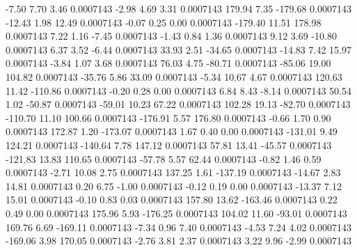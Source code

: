        -7.50        7.70        3.46     0.0007143
       -2.98        4.69        3.31     0.0007143
      179.94        7.35     -179.68     0.0007143
      -12.43        1.98       12.49     0.0007143
       -0.07        0.25        0.00     0.0007143
     -179.40       11.51      178.98     0.0007143
        7.22        1.16       -7.45     0.0007143
       -1.43        0.84        1.36     0.0007143
        9.12        3.69      -10.80     0.0007143
        6.37        3.52       -6.44     0.0007143
       33.93        2.51      -34.65     0.0007143
      -14.83        7.42       15.97     0.0007143
       -3.84        1.07        3.68     0.0007143
       76.03        4.75      -80.71     0.0007143
      -85.06       19.00      104.82     0.0007143
      -35.76        5.86       33.09     0.0007143
       -5.34       10.67        4.67     0.0007143
      120.63       11.42     -110.86     0.0007143
       -0.20        0.28        0.00     0.0007143
        6.84        8.43       -8.14     0.0007143
       50.54        1.02      -50.87     0.0007143
      -59.01       10.23       67.22     0.0007143
      102.28       19.13      -82.70     0.0007143
     -110.70       11.10      100.66     0.0007143
     -176.91        5.57      176.80     0.0007143
       -0.66        1.70        0.90     0.0007143
      172.87        1.20     -173.07     0.0007143
        1.67        0.40        0.00     0.0007143
     -131.01        9.49      124.21     0.0007143
     -140.64        7.78      147.12     0.0007143
       57.81       13.41      -45.57     0.0007143
     -121.83       13.83      110.65     0.0007143
      -57.78        5.57       62.44     0.0007143
       -0.82        1.46        0.59     0.0007143
       -2.71       10.08        2.75     0.0007143
      137.25        1.61     -137.19     0.0007143
      -14.67        2.83       14.81     0.0007143
        0.20        6.75       -1.00     0.0007143
       -0.12        0.19        0.00     0.0007143
      -13.37        7.12       15.01     0.0007143
       -0.10        0.83        0.03     0.0007143
      157.80       13.62     -163.46     0.0007143
        0.22        0.49        0.00     0.0007143
      175.96        5.93     -176.25     0.0007143
      104.02       11.60      -93.01     0.0007143
      169.76        6.69     -169.11     0.0007143
       -7.34        0.96        7.40     0.0007143
       -4.53        7.24        4.02     0.0007143
     -169.06        3.98      170.05     0.0007143
       -2.76        3.81        2.37     0.0007143
        3.22        9.96       -2.99     0.0007143

